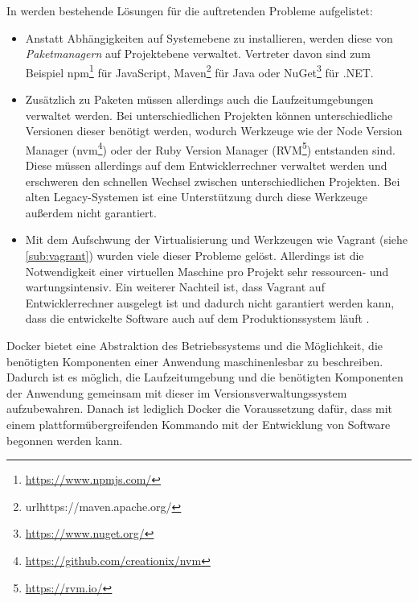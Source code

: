 In \autocite{smashing-local-devenv-docker:online} werden bestehende Lösungen für die auftretenden Probleme aufgelistet:
\begin{itemize}
    \item Anstatt Abhängigkeiten auf Systemebene zu installieren, werden diese von \emph{Paketmanagern} auf Projektebene verwaltet.
    Vertreter davon sind zum Beispiel npm\footnote{\url{https://www.npmjs.com/}} für JavaScript, Maven\footnote{url{https://maven.apache.org/}} für Java oder NuGet\footnote{\url{https://www.nuget.org/}} für .NET.
    \item Zusätzlich zu Paketen müssen allerdings auch die Laufzeitumgebungen verwaltet werden.
    Bei unterschiedlichen Projekten können unterschiedliche Versionen dieser benötigt werden, wodurch Werkzeuge wie der Node Version Manager (nvm\footnote{\url{https://github.com/creationix/nvm}}) oder der Ruby Version Manager (RVM\footnote{\url{https://rvm.io/}}) entstanden sind.
    Diese müssen allerdings auf dem Entwicklerrechner verwaltet werden und erschweren den schnellen Wechsel zwischen unterschiedlichen Projekten.
    Bei alten Legacy-Systemen ist eine Unterstützung durch diese Werkzeuge außerdem nicht garantiert.
    \item Mit dem Aufschwung der Virtualisierung und Werkzeugen wie Vagrant (siehe \cref{sub:vagrant}) wurden viele dieser Probleme gelöst.
    Allerdings ist die Notwendigkeit einer virtuellen Maschine pro Projekt sehr ressourcen- und wartungsintensiv.
    Ein weiterer Nachteil ist, dass Vagrant auf Entwicklerrechner ausgelegt ist und dadurch nicht garantiert werden kann, dass die entwickelte Software auch auf dem Produktionssystem läuft \autocite{laradock-docs:online}.
\end{itemize}
Docker bietet eine Abstraktion des Betriebssystems und die Möglichkeit, die benötigten Komponenten einer Anwendung maschinenlesbar zu beschreiben.
Dadurch ist es möglich, die Laufzeitumgebung und die benötigten Komponenten der Anwendung gemeinsam mit dieser im Versionsverwaltungssystem aufzubewahren.
Danach ist lediglich Docker die Voraussetzung dafür, dass mit einem plattformübergreifenden Kommando mit der Entwicklung von Software begonnen werden kann.

